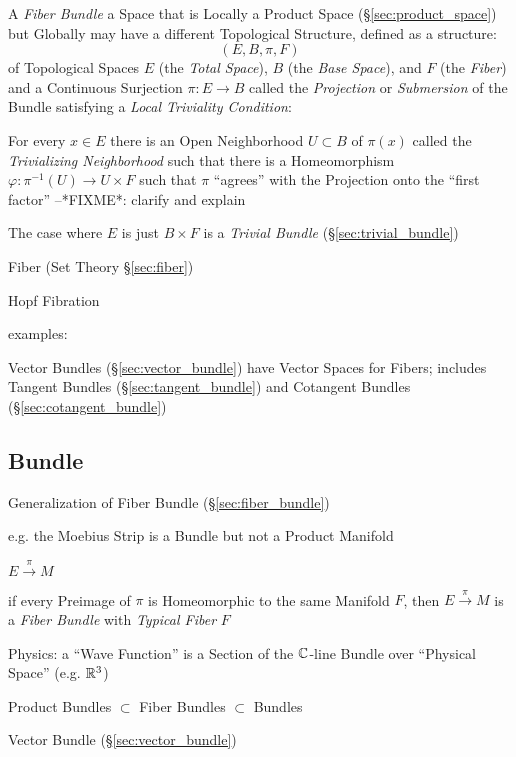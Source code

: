 A \emph{Fiber Bundle} a Space that is Locally a Product Space
(\S\ref{sec:product_space}) but Globally may have a different Topological
Structure, defined as a structure:
\[
  (E, B, \pi, F)
\]
of Topological Spaces $E$ (the \emph{Total Space}), $B$ (the \emph{Base
  Space}), and $F$ (the \emph{Fiber}) and a Continuous Surjection $\pi : E
\rightarrow B$ called the \emph{Projection} or \emph{Submersion} of the Bundle
satisfying a \emph{Local Triviality Condition}:

For every $x \in E$ there is an Open Neighborhood $U \subset B$ of $\pi(x)$
called the \emph{Trivializing Neighborhood} such that there is a Homeomorphism
$\varphi : \pi^{-1}(U) \rightarrow U \times F$ such that $\pi$ ``agrees'' with
the Projection onto the ``first factor'' --*FIXME*: clarify and explain

The case where $E$ is just $B \times F$ is a \emph{Trivial Bundle}
(\S\ref{sec:trivial_bundle})

\fist Fiber (Set Theory \S\ref{sec:fiber})

Hopf Fibration

examples:

Vector Bundles (\S\ref{sec:vector_bundle}) have Vector Spaces for Fibers;
includes Tangent Bundles (\S\ref{sec:tangent_bundle}) and Cotangent Bundles
(\S\ref{sec:cotangent_bundle})




\subsection{Bundle}\label{sec:bundle}

Generalization of Fiber Bundle (\S\ref{sec:fiber_bundle})

e.g. the Moebius Strip is a Bundle but not a Product Manifold

$E \xrightarrow{\pi} M$

if every Preimage of $\pi$ is Homeomorphic to the same Manifold $F$, then $E
\xrightarrow{\pi} M$ is a \emph{Fiber Bundle} with \emph{Typical Fiber} $F$

Physics: a ``Wave Function'' is a Section of the $\mathbb{C}$-line Bundle over
``Physical Space'' (e.g. $\mathbb{R}^3$)

Product Bundles $\subset$ Fiber Bundles $\subset$ Bundles

Vector Bundle (\S\ref{sec:vector_bundle})

